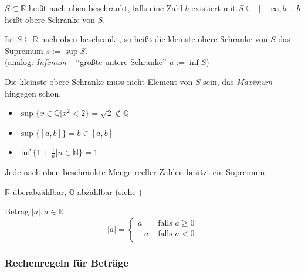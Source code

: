 \begin{definition}
$S \subset \mathbb{R}$ heißt nach oben beschränkt, falls eine Zahl $b$ existiert mit $S\subseteq \left]-\infty,b\right]$. $b$ heißt obere Schranke von $S$.
\end{definition}

\begin{definition}[Supremum]
Ist $S \subseteq \mathbb{R}$ nach oben beschränkt, so heißt die kleinste obere Schranke von $S$ das Supremum $s:=\sup S$.\\
(analog: \emph{Infimum} -- "`größte untere Schranke"' $u := \inf S$)
\end{definition}

\begin{note}Die kleinste obere Schranke muss nicht Element von $S$ sein, das \emph{Maximum} hingegen schon.\end{note}

\begin{example}
  \begin{itemize}
    \item $\sup \{x \in \mathbb{Q} | x^2 < 2 \} = \sqrt{2} \notin \mathbb{Q}$
    \item $\sup \{[a,b]\} = b \in [a,b]$
    \item $\inf \{ 1+\frac{1}{n}|n\in \mathbb{N}\} = 1$
  \end{itemize}
\end{example}

\begin{theorem}
Jede nach oben beschränkte Menge reeller Zahlen besitzt ein Supremum.
\end{theorem}

\begin{note}
$\mathbb{R}$ überabzählbar, $\mathbb{Q}$ abzählbar (siehe \cite[S. 11ff]{bornemann})
\end{note}

\begin{definition}[Betrag]
Betrag $|a|, a \in \mathbb{R}$\\
\[ |a| = 
\begin{cases}
 a & \text{ falls } a \geq 0 \\
 -a & \text{ falls } a < 0 \\
\end{cases}
\]
\end{definition}

\subsubsection*{Rechenregeln für Beträge}

